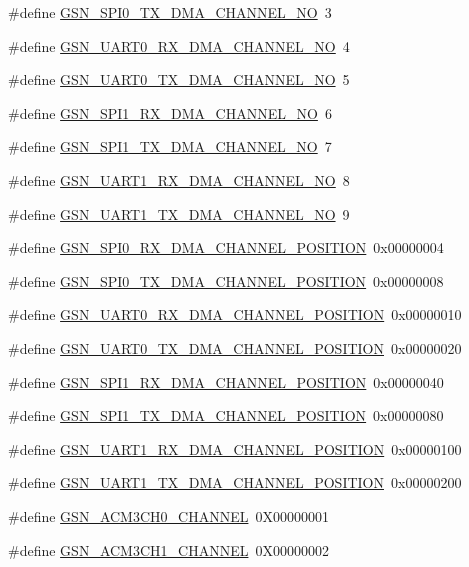 \begin{DoxyCompactItemize}
\#define \hyperlink{a00484_ad60298b55cb167a7474403a0b2db8987}{GSN\_\-SPI0\_\-TX\_\-DMA\_\-CHANNEL\_\-NO}~3
\item 
\#define \hyperlink{a00484_a36502973cc3d1fdac5fdf844245d5c41}{GSN\_\-UART0\_\-RX\_\-DMA\_\-CHANNEL\_\-NO}~4
\item 
\#define \hyperlink{a00484_afe69dfdc5c1d8da565f80843224d4400}{GSN\_\-UART0\_\-TX\_\-DMA\_\-CHANNEL\_\-NO}~5
\item 
\#define \hyperlink{a00484_a549ef3642c7fda450410e62b56c3de9e}{GSN\_\-SPI1\_\-RX\_\-DMA\_\-CHANNEL\_\-NO}~6
\item 
\#define \hyperlink{a00484_ab131954c327881d5fe08be1dd5510f3d}{GSN\_\-SPI1\_\-TX\_\-DMA\_\-CHANNEL\_\-NO}~7
\item 
\#define \hyperlink{a00484_a764876fc0a3f5d8b04993ca6b5ddbf62}{GSN\_\-UART1\_\-RX\_\-DMA\_\-CHANNEL\_\-NO}~8
\item 
\#define \hyperlink{a00484_a74b550c1871cad275c9f099bf48e3a34}{GSN\_\-UART1\_\-TX\_\-DMA\_\-CHANNEL\_\-NO}~9
\item 
\#define \hyperlink{a00484_aec38aae3207af38c56c242a61d77860c}{GSN\_\-SPI0\_\-RX\_\-DMA\_\-CHANNEL\_\-POSITION}~0x00000004
\item 
\#define \hyperlink{a00484_a6d7d2c2490563e135291e01c643cf3a2}{GSN\_\-SPI0\_\-TX\_\-DMA\_\-CHANNEL\_\-POSITION}~0x00000008
\item 
\#define \hyperlink{a00484_a6ab75e48baf9d4d47f57acb2ad5d5e4e}{GSN\_\-UART0\_\-RX\_\-DMA\_\-CHANNEL\_\-POSITION}~0x00000010
\item 
\#define \hyperlink{a00484_a6feeadb8169a6419cac6c600fdb1578a}{GSN\_\-UART0\_\-TX\_\-DMA\_\-CHANNEL\_\-POSITION}~0x00000020
\item 
\#define \hyperlink{a00484_ab332814b750e9d06dabe0aa4d0ab3845}{GSN\_\-SPI1\_\-RX\_\-DMA\_\-CHANNEL\_\-POSITION}~0x00000040
\item 
\#define \hyperlink{a00484_a433e53beca3e8fd24635b491bfa2aa19}{GSN\_\-SPI1\_\-TX\_\-DMA\_\-CHANNEL\_\-POSITION}~0x00000080
\item 
\#define \hyperlink{a00484_a8b6623ecbbaf5c3c6caa554e28b12def}{GSN\_\-UART1\_\-RX\_\-DMA\_\-CHANNEL\_\-POSITION}~0x00000100
\item 
\#define \hyperlink{a00484_ac9aa5902379af876a5371ab24a510bff}{GSN\_\-UART1\_\-TX\_\-DMA\_\-CHANNEL\_\-POSITION}~0x00000200
\item 
\#define \hyperlink{a00484_a5b2d635ead74aa250f85b2f594eee918}{GSN\_\-ACM3CH0\_\-CHANNEL}~0X00000001
\item 
\#define \hyperlink{a00484_a3202cde71d55159ac4796ff71b45cfc6}{GSN\_\-ACM3CH1\_\-CHANNEL}~0X00000002

\end{DoxyCompactItemize}
